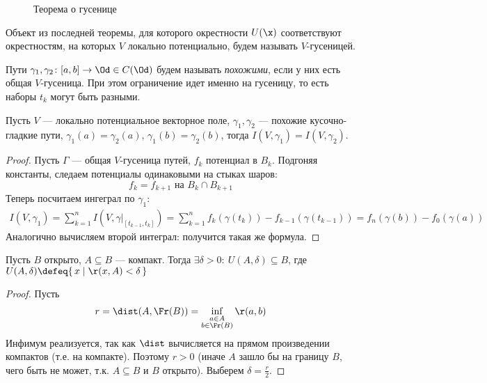 \newpage

\begin{figure}[ht]
    \centering
    \caption{Теорема о гусенице}
\end{figure}

\begin{definition}
    Объект из последней теоремы, для которого окрестности $U(\x)$ соответствуют
    окрестностям, на которых $V$ локально потенциально, будем называть $V$-гусеницей.
\end{definition}

\begin{definition}
    Пути $\gamma_1, \gamma_2 \colon [a, b] \to \Od \in C(\Od)$ будем называть
    \textit{похожими}, если у них есть общая $V$-гусеница. При этом ограничение
    идет именно на гусеницу, то есть наборы $t_k$ могут быть разными.
\end{definition}

\begin{lemma}

    Пусть $V$ --- локально потенциальное векторное поле, $\gamma_1, \gamma_2$ ---
    похожие кусочно-гладкие пути, $\gamma_1(a) = \gamma_2(a)$,
    $\gamma_1(b) = \gamma_2(b)$, тогда $I(V, \gamma_1) = I(V, \gamma_2)$.
\end{lemma}
\begin{proof}
    Пусть $\Gamma$ --- общая $V$-гусеница путей, $f_k$ потенциал в $B_k$.
    Подгоняя константы, следаем потенциалы одинаковыми на стыках шаров:
\[
    f_k = f_{k + 1} \text{ на } B_k \cap B_{k + 1}
\]
    Теперь посчитаем ингеграл по $\gamma_1$:
\begin{align*}
    I(V, \gamma_1) = \sum_{k = 1}^{n}{I\left(V, \gamma\big|_{[t_{k - 1}, t_k]}\right)}
    = \sum_{k = 1}^{n}{f_k(\gamma(t_k)) - f_{k - 1}(\gamma(t_{k - 1}))}
    = f_n(\gamma(b)) - f_0(\gamma(a))
\end{align*}
    Аналогично вычисляем второй интеграл: получится такая же формула.
\end{proof}

\begin{lemma}
    Пусть $B$ открыто, $A \subseteq B$ --- компакт. Тогда $\exists \delta > 0\colon
    ~ U(A, \delta) \subseteq B$, где $U(A, \delta) \defeq \{\, x \mid \r(x, A) < \delta \,\}$
\end{lemma}
\begin{proof}
    Пусть
\[
    r = \dist(A, \Fr(B)) = \inf_{\substack{a \in A \\ b \in \Fr(B)}}{\r(a, b)}
\]
    Инфимум реализуется, так как $\dist$ вычисляется на прямом произведении
    компактов (т.е. на компакте). Поэтому $r > 0$ (иначе $A$ зашло бы на границу
    $B$, чего быть не может, т.к. $A \subseteq B$ и $B$ открыто). Выберем
    $\displaystyle \delta = \frac{r}{2}$.
\end{proof}

